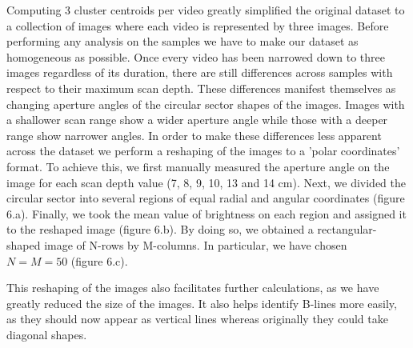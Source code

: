 \documentclass[12pt]{article} %
\begin{document}
	Computing 3 cluster centroids per video greatly simplified the original dataset to a collection of images where each video is represented by three images. Before performing any analysis on the samples we have to make our dataset as homogeneous as possible. Once every video has been narrowed down to three images regardless of its duration, there are still differences across samples with respect to their maximum scan depth. These differences manifest themselves as changing aperture angles of the circular sector shapes of the images. Images with a shallower scan range show a wider aperture angle while those with a deeper range show narrower angles. In order to make these differences less apparent across the dataset we perform a reshaping of the images to a 'polar coordinates' format. To achieve this, we first manually measured the aperture angle on the image for each scan depth value (7, 8, 9, 10, 13 and 14 cm). Next, we divided the circular sector into several regions of equal radial and angular coordinates (figure 6.a). Finally, we took the mean value of brightness on each region and assigned it to the reshaped image (figure 6.b). By doing so, we obtained a rectangular-shaped image of N-rows by M-columns. In particular, we have chosen $N = M = 50$ (figure 6.c).
	
	This reshaping of the images also facilitates further calculations, as we have greatly reduced the size of the images. It also helps identify B-lines more easily, as they should now appear as vertical lines whereas originally they could take diagonal shapes. 
	
\end{document}
